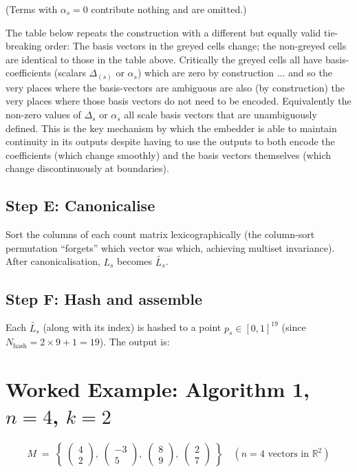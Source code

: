 \documentclass[11pt,a4paper]{article}
\newcommand{\canon}[1]{\widetilde{#1}}  %
\newcommand{\R}{\mathbb{R}}
\begin{document}
\noindent
(Terms with $\alpha_s=0$ contribute nothing and are omitted.)

\noindent
The table below repeats the construction with a different but equally valid
tie-breaking order: 
The basis vectors in the greyed cells change; the non-greyed cells
are identical to those in the table above.  Critically the greyed cells all have basis-coefficients
(scalars  $\Delta_{(s)}$ or $\alpha_{s}$) which are zero by construction ... and so
 the very places where the basis-vectors are ambiguous are also (by construction)
  the very places where those basis vectors do not need to be encoded. Equivalently the
   non-zero values of $\Delta_s$ or $\alpha_s$ all scale basis vectors that are unambiguously defined.
    This is the key mechanism by which the embedder is able to maintain continuity in its outputs despite
      having to use the outputs to both encode the coefficients (which change smoothly) and the basis vectors
      themselves (which change discontinuously at boundaries).



\subsection*{Step E: Canonicalise}

Sort the columns of each count matrix lexicographically (the column-sort
permutation ``forgets'' which vector was which, achieving multiset invariance).
After canonicalisation, $L_s$ becomes $\canon{L_s}$.

\subsection*{Step F: Hash and assemble}

Each $\canon{L_s}$ (along with its index) is hashed to a point $p_s \in
[0,1]^{19}$ (since $N_{\text{hash}} = 2{\times}9{+}1 = 19$).
The output is:


\section{Worked Example: Algorithm 1, $n=4$, $k=2$}
\label{sec:example-alg1}

\[
  M \;=\; \left\{\;
    \begin{pmatrix}4\\2\end{pmatrix},\;
    \begin{pmatrix}-3\\5\end{pmatrix},\;
    \begin{pmatrix}8\\9\end{pmatrix},\;
    \begin{pmatrix}2\\7\end{pmatrix}
  \;\right\}
  \quad (n=4 \text{ vectors in } \R^2)
\]
\end{document}
